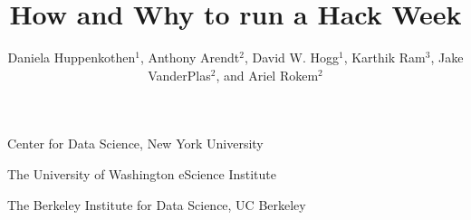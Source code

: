 \documentclass{nature}
\title{How and Why to run a Hack Week}
\author{Daniela Huppenkothen$^1$, Anthony Arendt$^2$, David W. Hogg$^1$, Karthik Ram$^3$, Jake VanderPlas$^2$, and Ariel Rokem$^2$}
\begin{document}
\maketitle

\begin{affiliations}
 \item Center for Data Science, New York University
 \item The University of Washington eScience Institute
 \item The Berkeley Institute for Data Science, UC Berkeley
\end{affiliations}














\end{document}
